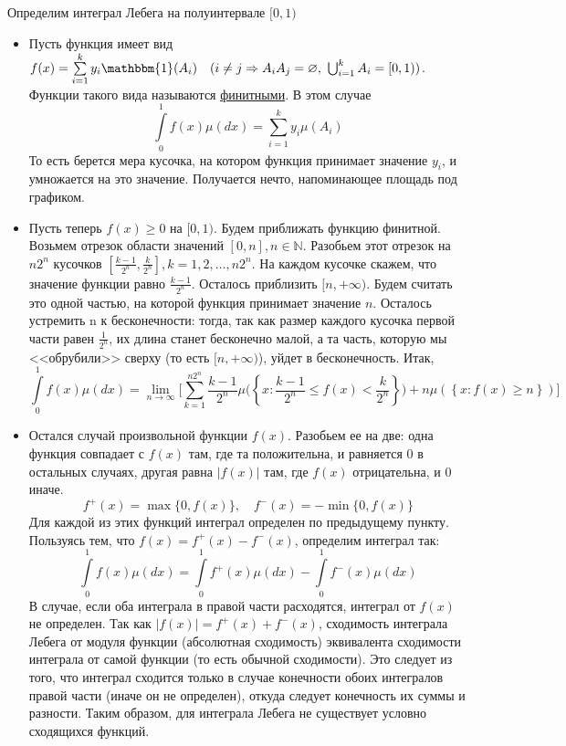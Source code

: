 \documentclass[12pt]{article}
\numberwithin{Th}{section}
\numberwithin{Def}{section}
\numberwithin{Lem}{section}
\numberwithin{St}{section}
\numberwithin{equation}{section}
\newcommand\Set[2]{\left\{ #1 \colon #2 \right\}}
\newcommand\Ind{\mathbbm{1}} %
\begin{document}
 Определим интеграл Лебега на полуинтервале $[0, 1)$
\begin{itemize}
 	\item Пусть функция имеет вид $f(x) = \sum\limits_{i=1}^ky_i \Ind(A_i) \quad (i \not= j \Rightarrow A_iA_j = \varnothing, \ \bigcup_{i=1}^k A_i= [0,1))$. Функции такого вида 		называются \underline{финитными}.  В этом случае
 		$$\int\limits_0^1f(x)\mu(dx) = \sum\limits_{i=1}^k y_i \mu(A_i) $$
	То есть берется мера кусочка, на котором функция принимает значение $y_i$, и умножается на это значение. Получается нечто, напоминающее площадь под графиком.
	\item Пусть теперь $f(x) \ge 0$ на $[0, 1)$. Будем приближать функцию финитной. Возьмем отрезок области значений $[0, n], n \in \mathbb{N}$. Разобьем этот отрезок на
	$n2^n$ кусочков $[\frac{k-1}{2^n}, \frac{k}{2^n}], k = 1, 2, \dots, n2^n$. На каждом кусочке скажем, что значение функции равно $\frac{k-1}{2^n}$. Осталось приблизить 
	$[n, +\infty)$. Будем считать это одной частью, на которой функция принимает значение $n$. Осталось устремить n к бесконечности: тогда, так как размер каждого кусочка первой части равен $\frac{1}{2^n}$, их длина станет бесконечно малой, а та часть, которую мы <<обрубили>> сверху (то есть $[n, +\infty)$), уйдет в бесконечность. Итак,
	$$ \int\limits_0^1 f(x) \mu(dx) = \lim_{n \to \infty}  \biggl[  \sum\limits_{k=1}^{n2^n} \frac{k-1}{2^n} \mu\biggl(\Set{x}{\frac{k-1}{2^n} \le f(x) < \frac{k}{2^n}}\biggl) 
	+ n \mu(\Set{x}{f(x) \ge n})\biggl]$$
	\item Остался случай произвольной функции $f(x)$. Разобьем ее на две: одна функция совпадает с $f(x)$ там, где та положительна, и равняется 0 в остальных случаях,
	другая равна $|f(x)|$ там, где $f(x)$ отрицательна, и 0 иначе. 
	$$ f^+(x) = \max\{0, f(x)\},\quad f^-(x) = -\min\{0, f(x)\}$$
	Для каждой из этих функций интеграл определен по предыдущему пункту. Пользуясь тем, что $f(x) = f^+(x) - f^-(x)$, определим интеграл так:
	$$  \int\limits_0^1 f(x) \mu(dx) =  \int\limits_0^1 f^+(x) \mu(dx) - \int\limits_0^1 f^-(x) \mu(dx) $$
	В случае, если оба интеграла в правой части расходятся, интеграл от $f(x)$ не определен. 
	Так как $|f(x)| = f^+(x) + f^-(x)$, сходимость интеграла Лебега от модуля функции (абсолютная сходимость) эквивалента сходимости интеграла от самой функции
	(то есть обычной сходимости). Это следует из того, что интеграл сходится только в случае конечности обоих интегралов правой части (иначе он не определен), откуда 
	следует конечность их суммы и разности. Таким образом, для интеграла Лебега не существует условно сходящихся функций.
\end{itemize}
\end{document}

